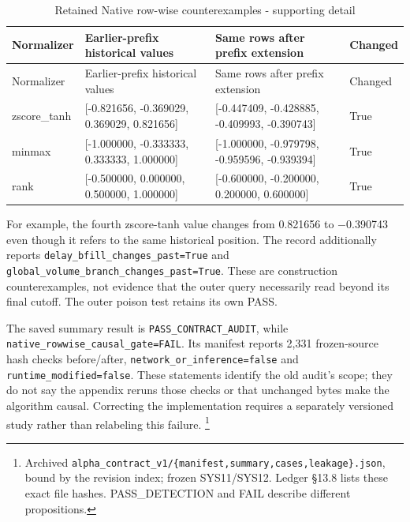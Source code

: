 \begingroup
\small
{}
\setlength{\tabcolsep}{3pt}

\begin{longtable}[]{@{}
  >{\raggedright\arraybackslash}p{}
  >{\raggedright\arraybackslash}p{}
  >{\raggedright\arraybackslash}p{}
  >{\raggedright\arraybackslash}p{}@{}}
\caption{Retained Native row-wise counterexamples - supporting detail}\label{tab:E_verification:2}\tabularnewline
\toprule\noalign{}
Normalizer
 & Earlier-prefix historical values
 & Same rows after prefix extension
 & Changed
 \\
\midrule\noalign{}
\endfirsthead
\toprule\noalign{}
Normalizer
 & Earlier-prefix historical values
 & Same rows after prefix extension
 & Changed
 \\
\midrule\noalign{}
\endhead
\bottomrule\noalign{}
\endlastfoot
zscore\_\allowbreak{}tanh & {[}-0.821656, -0.369029, 0.369029, 0.821656{]} & {[}-0.447409, -0.428885, -0.409993, -0.390743{]} & True \\
minmax & {[}-1.000000, -0.333333, 0.333333, 1.000000{]} & {[}-1.000000, -0.979798, -0.959596, -0.939394{]} & True \\
rank & {[}-0.500000, 0.000000, 0.500000, 1.000000{]} & {[}-0.600000, -0.200000, 0.200000, 0.600000{]} & True \\
\end{longtable}

\endgroup

For example, the fourth zscore-tanh value changes from 0.821656 to
\ensuremath{-}0.390743 even though it refers to the same historical position. The
record additionally reports \texttt{delay\_\allowbreak{}bfill\_\allowbreak{}changes\_\allowbreak{}past=True} and
\texttt{global\_\allowbreak{}volume\_\allowbreak{}branch\_\allowbreak{}changes\_\allowbreak{}past=True}. These are construction
counterexamples, not evidence that the outer query necessarily read
beyond its final cutoff. The outer poison test retains its own PASS.

The saved summary result is \texttt{PASS\_\allowbreak{}CONTRACT\_\allowbreak{}AUDIT}, while
\texttt{native\_\allowbreak{}rowwise\_\allowbreak{}causal\_\allowbreak{}gate=FAIL}. Its manifest reports 2,331 frozen-source
hash checks before/after, \texttt{network\_\allowbreak{}or\_\allowbreak{}inference=false} and
\texttt{runtime\_\allowbreak{}modified=false}. These statements identify the old audit's scope;
they do not say the appendix reruns those checks or that unchanged bytes
make the algorithm causal. Correcting the implementation requires a
separately versioned study rather than relabeling this failure.
\footnote{Archived \texttt{alpha\_\allowbreak{}contract\_\allowbreak{}v1/\allowbreak{}\{manifest,summary,cases,leakage\}.\allowbreak{}json}, bound by the revision index; frozen SYS11/SYS12. Ledger §13.8 lists these exact file hashes. PASS\_\allowbreak{}DETECTION and FAIL describe different propositions.}

